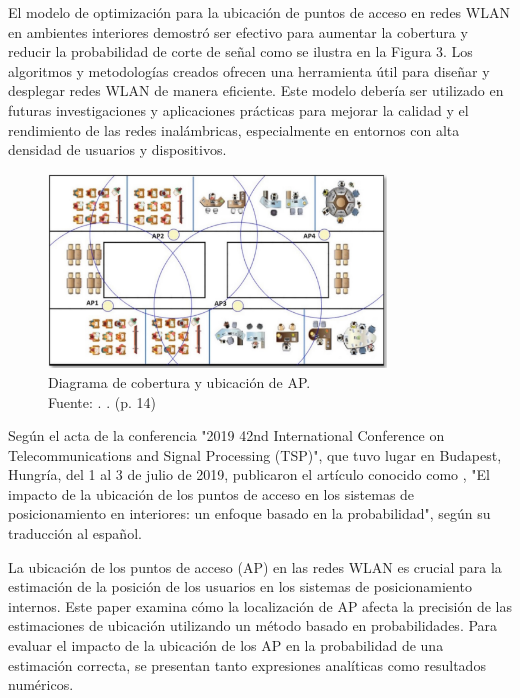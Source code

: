 El modelo de optimización para la ubicación de puntos de acceso en redes WLAN en ambientes interiores demostró ser efectivo para aumentar la cobertura y reducir la probabilidad de corte de señal como se ilustra en la Figura 3. Los algoritmos y metodologías creados ofrecen una herramienta útil para diseñar y desplegar redes WLAN de manera eficiente. Este modelo debería ser utilizado en futuras investigaciones y aplicaciones prácticas para mejorar la calidad y el rendimiento de las redes inalámbricas, especialmente en entornos con alta densidad de usuarios y dispositivos.

\begin{figure}[!ht]
	\begin{center}
		\includegraphics[width=0.80\textwidth]{2/figures/contreras2021.png}
		\caption[Diagrama de cobertura y ubicación de AP]{Diagrama de cobertura y ubicación de AP.\\
			Fuente: \cite{pr_contreras2021modelwlan}. . (p. 14)}
		\label{2:fig111}
	\end{center}
\end{figure}

Según el acta de la conferencia "2019 42nd International Conference on Telecommunications and Signal Processing (TSP)", que tuvo lugar en Budapest, Hungría, del 1 al 3 de julio de 2019, \cite{pr_ahmed2019impactaps} publicaron el artículo conocido como , "El impacto de la ubicación de los puntos de acceso en los sistemas de posicionamiento en interiores: un enfoque basado en la probabilidad", según su traducción al español.

La ubicación de los puntos de acceso (AP) en las redes WLAN es crucial para la estimación de la posición de los usuarios en los sistemas de posicionamiento internos. Este paper examina cómo la localización de AP afecta la precisión de las estimaciones de ubicación utilizando un método basado en probabilidades. Para evaluar el impacto de la ubicación de los AP en la probabilidad de una estimación correcta, se presentan tanto expresiones analíticas como resultados numéricos.

